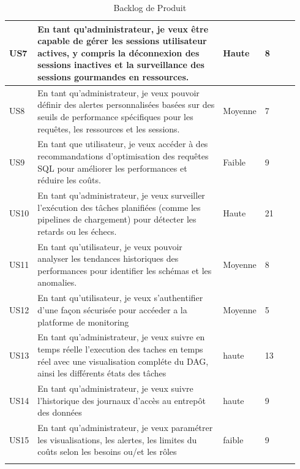 \begin{center}
\begin{longtable}{|p{0.05\linewidth}|p{0.65\linewidth}|p{0.12\linewidth}|p{0.12\linewidth}|}
        \hline
        
        US7 &  En tant qu'administrateur, je veux être capable de gérer les sessions utilisateur actives, y compris la déconnexion des sessions inactives et la surveillance des sessions gourmandes en ressources. & Haute & 8 \\
        
        \hline
        
        US8 &  En tant qu'administrateur, je veux pouvoir définir des alertes personnalisées basées sur des seuils de performance spécifiques pour les requêtes, les ressources et les sessions. & Moyenne & 7 \\
        
        \hline
        
        US9 &  En tant que utilisateur, je veux accéder à des recommandations d'optimisation des requêtes SQL pour améliorer les performances et réduire les coûts. & Faible & 9 \\
        
        \hline
        
        US10& En tant qu'administrateur, je veux surveiller l'exécution des tâches planifiées (comme les pipelines de chargement) pour détecter les retards ou les échecs. & Haute & 21 \\
        
        \hline
        
        US11 & En tant qu'utilisateur, je veux pouvoir analyser les tendances historiques des performances pour identifier les schémas et les anomalies. & Moyenne & 8 \\
        
        \hline
        
        US12 & En tant qu'utilisateur, je veux s'authentifier d'une façon sécurisée pour accéeder a la platforme de monitoring & Moyenne & 5 \\
        
        \hline
        US13 & En tant qu'administrateur, je veux suivre en temps réelle l'execution des taches en temps réel avec une visualisation compléte du DAG, ainsi les différents états des tâches  & haute & 13 \\
        
        \hline
        US14 & En tant qu'administrateur, je veux suivre l'historique des journaux d'accès au entrepôt des données & haute & 9 \\
        
        \hline
        US15 & En tant qu'administrateur, je veux paramétrer les visualisations, les alertes, les limites du coûts selon les besoins ou/et les rôles & faible & 9 \\
        
        \hline
        
        \caption{Backlog de Produit}
        \label{tab:backlog_produit}
    \end{longtable}
    \par 

\end{center}
